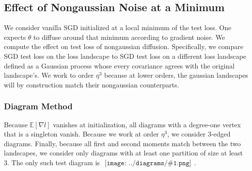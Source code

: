 \documentclass{article}
\newcommand{\expct}[1]{\mathbb{E}\left[#1\right]}
\newcommand{\sdia}[1]{\begin{gathered}\texttt{[image: ../diagrams/\#1.png]}\end{gathered}}
\begin{document}
    \subsection*{Effect of Nongaussian Noise at a Minimum}
        We consider vanilla SGD initialized at a local minimum of the test loss.
        One expects $\theta$ to diffuse around that minimum according to
        gradient noise.  We compute the effect on test loss of nongaussian
        diffusion.  Specifically, we compare SGD test loss on the loss
        landscape to SGD test loss on a different loss landscape defined as a
        Gaussian process whose every covariance agrees with the original
        landscape's.  We work to order $\eta^3$ because at lower orders,
        the gaussian landscapes will by construction match their nongaussian
        counterparts.

        \subsubsection*{Diagram Method}
            Because $\expct{\nabla l}$ vanishes at initialization, all diagrams
            with a degree-one vertex that is a singleton vanish.  Because we
            work at order $\eta^3$, we consider $3$-edged diagrams.  Finally,
            because all first and second moments match between the two
            landscapes, we consider only diagrams with at least one partition
            of size at least $3$.  The only such test diagram is
            $\sdia{c(012-3)(03-13-23)}$.
\end{document}
